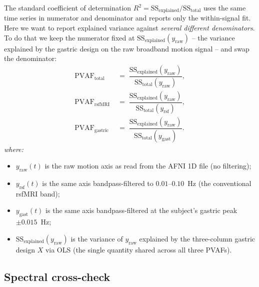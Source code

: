 \documentclass[11pt]{article}
\newcommand{\PVAF}{\mathrm{PVAF}}
\newcommand{\SSE}{\mathrm{SS_{explained}}}
\newcommand{\SST}{\mathrm{SS_{total}}}
\begin{document}
The standard coefficient of determination $R^{2} = \SSE/\SST$ uses the
same time series in numerator and denominator and reports only the
within-signal fit. Here we want to report explained variance against
\emph{several different denominators}. To do that we keep the numerator
fixed at $\SSE(y_{\text{raw}})$ -- the variance explained by the
gastric design on the raw broadband motion signal -- and swap the
denominator:
\begin{equation}
\boxed{
\begin{aligned}
\PVAF_{\text{total}}   &\;=\; \dfrac{\SSE(y_{\text{raw}})}{\SST(y_{\text{raw}})}, \\[4pt]
\PVAF_{\text{rsfMRI}}  &\;=\; \dfrac{\SSE(y_{\text{raw}})}{\SST(y_{\text{rsf}})}, \\[4pt]
\PVAF_{\text{gastric}} &\;=\; \dfrac{\SSE(y_{\text{raw}})}{\SST(y_{\text{gast}})}.
\end{aligned}
}
\label{eq:pvaf}
\end{equation}
\textit{where:}
\begin{itemize}\setlength{\itemsep}{1pt}
\item $y_{\text{raw}}(t)$ is the raw motion axis as read from the AFNI
1D file (no filtering);
\item $y_{\text{rsf}}(t)$ is the same axis bandpass-filtered to
$0.01$--$0.10$~Hz (the conventional rsfMRI band);
\item $y_{\text{gast}}(t)$ is the same axis bandpass-filtered at the
subject's gastric peak $\pm 0.015$~Hz;
\item $\SSE(y_{\text{raw}})$ is the variance of $y_{\text{raw}}$
explained by the three-column gastric design $X$ via OLS (the single
quantity shared across all three PVAFs).
\end{itemize}

\subsection{Spectral cross-check}
\end{document}
